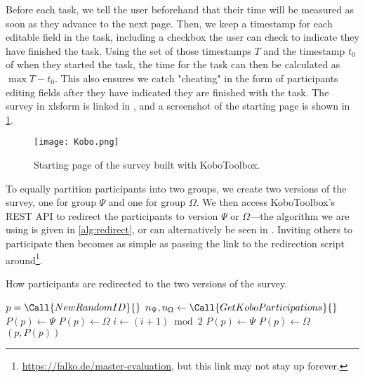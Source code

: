 \documentclass[../thesis]{subfiles}
\begin{document}
Before each task, we tell the user beforehand that their time will be measured as soon as they advance to the next page.
Then, we keep a timestamp for each editable field in the task, including a checkbox the user can check to indicate they have finished the task.
Using the set of those timestamps $T$ and the timestamp $t_0$ of when they started the task, the time for the task can then be calculated as $\max T - t_0$.
This also ensures we catch "cheating" in the form of participants editing fields after they have indicated they are finished with the task.
The survey in \gls{xlsform} is linked in , and a screenshot of the starting page is shown in \cref{fig:kobo}.

\begin{figure}
	\begin{center}
		\texttt{[image: Kobo.png]}
	\end{center}
	\caption{Starting page of the survey built with KoboToolbox.}\label{fig:kobo}
\end{figure}


To equally partition participants into two groups, we create two versions of the survey, one for group $\Psi$ and one for group $\Omega$.
We then access KoboToolbox's REST API to redirect the participants to version $\Psi$ or $\Omega$---the algorithm we are using is given in \cref{alg:redirect}, or can alternatively be seen in .
Inviting others to participate then becomes as simple as passing the link to the redirection script around\footnote{
	\url{https://falko.de/master-evaluation}, but this link may not stay up forever.
}.

\begin{algorithm}
	\tikzexternaldisable
	\caption{How participants are redirected to the two versions of the survey.}\label{alg:redirect}
	\begin{algorithmic}[1]
		\small
		\State $p = \Call{NewRandomID}{\null}$
		\EndIf
		\State $n_{\Psi}, n_{\Omega} \gets \Call{GetKoboParticipations}{\null}$
		\State $P(p) \gets \Psi$
		\Else
		\State $P(p) \gets \Omega$
		\EndIf
		\State $i \gets (i + 1) \bmod 2$
		\State $P(p) \gets \Psi$
		\Else
		\State $P(p) \gets \Omega$
		\EndIf
		\EndIf
		\State \Return $(p, P(p))$
	\end{algorithmic}
	\tikzexternalenable
\end{algorithm}
\end{document}
